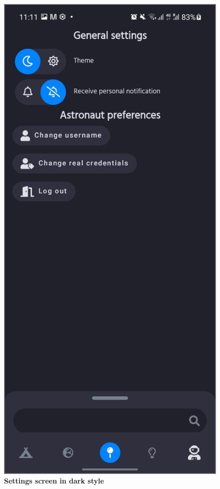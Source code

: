 \begin{figure}[!htb]
\begin{minipage}{.48\textwidth}
\centering
\includegraphics[width=.9\textwidth]{../Images/UI/SettingsDark.jpg}
\caption{\label{fig:dbapiuser}\textbf{Settings screen in dark style}}
\end{minipage}
\end{figure}

